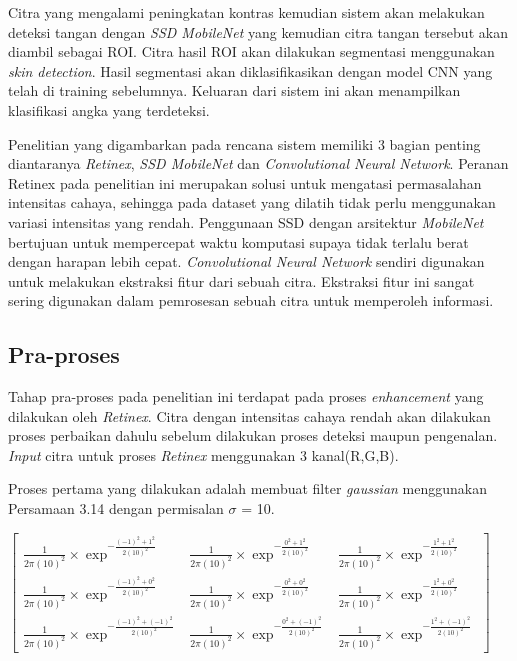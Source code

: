 \noindent Citra yang mengalami peningkatan kontras kemudian sistem akan melakukan deteksi tangan dengan \emph{SSD MobileNet} yang kemudian citra tangan tersebut akan diambil sebagai ROI. 
Citra hasil ROI akan dilakukan segmentasi menggunakan \emph{skin detection}. Hasil segmentasi akan diklasifikasikan dengan model CNN yang telah di training sebelumnya.
Keluaran dari sistem ini akan menampilkan klasifikasi angka yang terdeteksi.

Penelitian yang digambarkan pada rencana sistem memiliki 3 bagian penting diantaranya \emph{Retinex}, \emph{SSD MobileNet} dan \emph{Convolutional Neural Network}.
Peranan Retinex pada penelitian ini merupakan solusi untuk mengatasi permasalahan intensitas cahaya, sehingga pada dataset yang dilatih tidak perlu menggunakan variasi intensitas yang rendah. Penggunaan SSD dengan arsitektur \emph{MobileNet} bertujuan untuk mempercepat waktu komputasi supaya tidak terlalu berat dengan harapan lebih cepat. \emph{Convolutional Neural Network} sendiri digunakan untuk melakukan ekstraksi fitur dari sebuah citra. Ekstraksi fitur ini sangat sering digunakan dalam pemrosesan sebuah citra untuk memperoleh informasi. 
\subsection{Pra-proses}
Tahap pra-proses pada penelitian ini terdapat pada proses \emph{enhancement} yang dilakukan oleh \emph{Retinex}. Citra dengan intensitas cahaya rendah akan dilakukan proses perbaikan dahulu sebelum dilakukan proses deteksi maupun pengenalan. \emph{Input} citra untuk proses \emph{Retinex} menggunakan 3 kanal(R,G,B).

Proses pertama yang dilakukan adalah membuat filter \emph{gaussian} menggunakan Persamaan 3.14 dengan permisalan $\sigma$ = 10.

\noindent
$\left[
\begin{matrix}
	\frac{1}{2\pi(10)^2}\times \exp^{-\frac{(-1)^2+1^2}{2(10)^2}} & \frac{1}{2\pi(10)^2}\times \exp^{-\frac{0^2+1^2}{2(10)^2}} &\frac{1}{2\pi(10)^2}\times \exp^{-\frac{1^2+1^2}{2(10)^2}} \\
	\frac{1}{2\pi(10)^2}\times \exp^{-\frac{(-1)^2+0^2}{2(10)^2}} & \frac{1}{2\pi(10)^2}\times \exp^{-\frac{0^2+0^2}{2(10)^2}} &\frac{1}{2\pi(10)^2}\times \exp^{-\frac{1^2+0^2}{2(10)^2}} \\
	\frac{1}{2\pi(10)^2}\times \exp^{-\frac{(-1)^2+(-1)^2}{2(10)^2}} & \frac{1}{2\pi(10)^2}\times \exp^{-\frac{0^2+(-1)^2}{2(10)^2}} &\frac{1}{2\pi(10)^2}\times \exp^{-\frac{1^2+(-1)^2}{2(10)^2}} 	
\end{matrix}
\right]$

